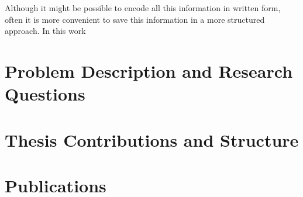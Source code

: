 Although it might be possible to encode all this information in written form, often it is more convenient to save this information in a more structured approach. In this work 

\section{Problem Description and Research Questions}


\section{Thesis Contributions and Structure}



\section{Publications}